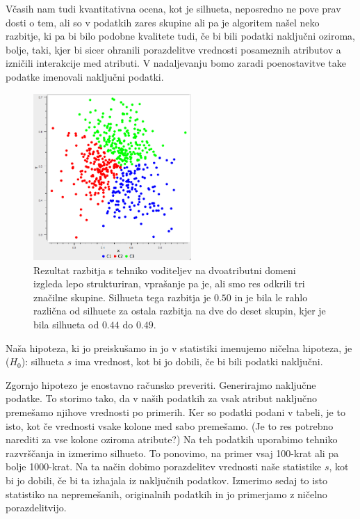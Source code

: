 Včasih nam tudi kvantitativna ocena, kot je silhueta, neposredno ne
pove prav dosti o tem, ali so v podatkih zares skupine ali pa je
algoritem našel neko razbitje, ki pa bi bilo podobne kvalitete tudi,
če bi bili podatki naključni oziroma, bolje, taki, kjer bi sicer
ohranili porazdelitve vrednosti posameznih atributov a izničili
interakcije med atributi. V nadaljevanju bomo zaradi poenostavitve
take podatke imenovali naključni podatki.

\begin{figure}[htbp]
\begin{center}
  \includegraphics[width=6cm]{slike/kmeans-wrong-scatter.png}
\caption{Rezultat razbitja s tehniko voditeljev na dvoatributni domeni
izgleda lepo strukturiran, vprašanje pa je, ali smo res odkrili tri
značilne skupine. Silhueta tega razbitja je $0.50$ in je bila le rahlo
različna od silhuete za ostala razbitja na dve do deset skupin, kjer
je bila silhueta od $0.44$ do $0.49$.}
\label{f-kmeans-hairball}
\end{center}
\end{figure}


Naša hipoteza, ki jo preiskušamo in jo v statistiki imenujemo ničelna
hipoteza, je ($H_0$): silhueta $s$ ima vrednost, kot bi jo dobili,
če bi bili podatki naključni.

Zgornjo hipotezo je enostavno računsko preveriti. Generirajmo naključne
podatke. To storimo tako, da v naših podatkih za vsak atribut
naključno premešamo njihove vrednosti po primerih. Ker so podatki
podani v tabeli, je to isto, kot če vrednosti vsake kolone med sabo
premešamo. (Je to res potrebno narediti za vse kolone oziroma
atribute?) Na teh podatkih uporabimo tehniko razvrščanja in izmerimo
silhueto. To ponovimo, na primer vsaj 100-krat ali pa bolje
1000-krat. Na ta način dobimo porazdelitev vrednosti naše statistike
$s$, kot bi jo dobili, če bi ta izhajala iz naključnih
podatkov. Izmerimo sedaj to isto statistiko na nepremešanih,
originalnih podatkih in jo primerjamo z ničelno porazdelitvijo.

